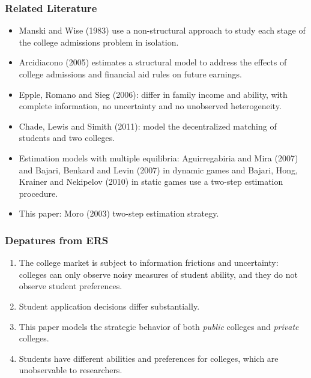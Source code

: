 \documentclass[10pt]{beamer}
\begin{document}
\begin{frame}[c]\frametitle{Related Literature}

\begin{itemize}
    \item \alert{Manski and Wise} (1983) use a non-structural approach to study each stage of the college admissions problem in isolation.
    \item \alert{Arcidiacono} (2005) estimates a structural model to address the effects of college admissions and financial aid rules on future earnings.
    \item \alert{Epple, Romano and Sieg} (2006): differ in family income and ability, with complete information, no uncertainty and no unobserved heterogeneity.
    \item \alert{Chade, Lewis and Simith} (2011): model the decentralized matching of students and two colleges.
    \item Estimation models with multiple equilibria: Aguirregabiria and Mira (2007) and Bajari, Benkard and Levin (2007) in dynamic games and Bajari, Hong, Krainer and Nekipelov (2010) in static games use a two-step estimation procedure.
    \item This paper: \alert{Moro} (2003) two-step estimation strategy.
\end{itemize}

\end{frame}

\begin{frame}[c]\frametitle{Depatures from ERS}

\begin{enumerate}
    \item The college market is subject to \alert{information frictions} and \alert{uncertainty}: colleges can only observe noisy measures of student ability, and they do not observe student preferences.
    \item Student application decisions \alert{differ substantially}.
    \item This paper models the \alert{strategic behavior} of both \textit{public} colleges and \textit{private} colleges.
    \item Students have \alert{different abilities and preferences} for colleges, which are unobservable to researchers.
\end{enumerate}



\end{frame}
\end{document}
